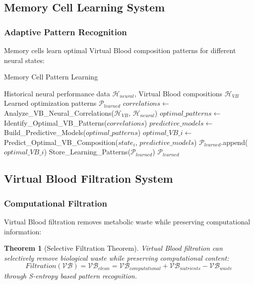 \documentclass[12pt,a4paper]{article}
\newtheorem{theorem}{Theorem}
\begin{document}
\subsection{Memory Cell Learning System}

\subsubsection{Adaptive Pattern Recognition}

Memory cells learn optimal Virtual Blood composition patterns for different neural states:

\begin{algorithm}
\caption{Memory Cell Pattern Learning}
\begin{algorithmic}[1]
\Require Historical neural performance data $\mathcal{H}_{neural}$, Virtual Blood compositions $\mathcal{H}_{VB}$
\Ensure Learned optimization patterns $\mathcal{P}_{learned}$
\State $correlations \leftarrow$ Analyze\_VB\_Neural\_Correlations($\mathcal{H}_{VB}$, $\mathcal{H}_{neural}$)
\State $optimal\_patterns \leftarrow$ Identify\_Optimal\_VB\_Patterns($correlations$)
\State $predictive\_models \leftarrow$ Build\_Predictive\_Models($optimal\_patterns$)
    \State $optimal\_VB\_i \leftarrow$ Predict\_Optimal\_VB\_Composition($state_i$, $predictive\_models$)
    \State $\mathcal{P}_{learned}$.append($optimal\_VB\_i$)
\EndFor
\State Store\_Learning\_Patterns($\mathcal{P}_{learned}$)
\State \Return $\mathcal{P}_{learned}$
\end{algorithmic}
\end{algorithm}

\subsection{Virtual Blood Filtration System}

\subsubsection{Computational Filtration}

Virtual Blood filtration removes metabolic waste while preserving computational information:

\begin{theorem}[Selective Filtration Theorem]
Virtual Blood filtration can selectively remove biological waste while preserving computational content:
\begin{equation}
Filtration(\mathcal{VB}) = \mathcal{VB}_{clean} = \mathcal{VB}_{computational} + \mathcal{VB}_{nutrients} - \mathcal{VB}_{waste}
\end{equation}
through S-entropy based pattern recognition.
\end{theorem}
\end{document}
